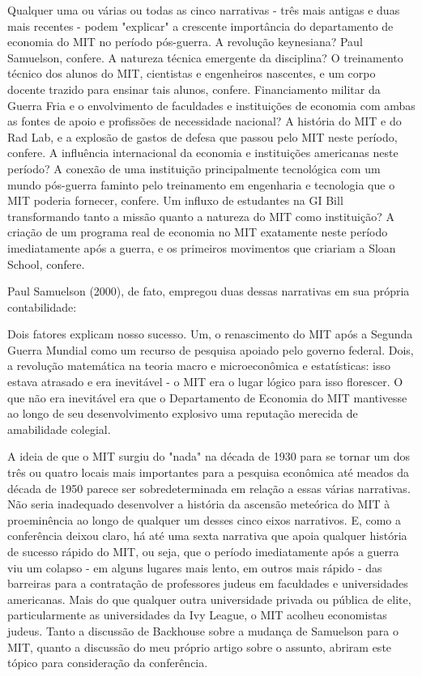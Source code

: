\documentclass[a4paper,12pt]{article}[abntex2]
\begin{document}
Qualquer uma ou várias ou todas as cinco narrativas - três mais antigas e duas mais recentes - podem "explicar" a crescente importância do departamento de economia do MIT no período pós-guerra. A revolução keynesiana? Paul Samuelson, confere. A natureza técnica emergente da disciplina? O treinamento técnico dos alunos do MIT, cientistas e engenheiros nascentes, e um corpo docente trazido para ensinar tais alunos, confere. Financiamento militar da Guerra Fria e o envolvimento de faculdades e instituições de economia com ambas as fontes de apoio e profissões de necessidade nacional? A história do MIT e do Rad Lab, e a explosão de gastos de defesa que passou pelo MIT neste período, confere. A influência internacional da economia e instituições americanas neste período? A conexão de uma instituição principalmente tecnológica com um mundo pós-guerra faminto pelo treinamento em engenharia e tecnologia que o MIT poderia fornecer, confere. Um influxo de estudantes na GI Bill transformando tanto a missão quanto a natureza do MIT como instituição? A criação de um programa real de economia no MIT exatamente neste período imediatamente após a guerra, e os primeiros movimentos que criariam a Sloan School, confere.

Paul Samuelson (2000), de fato, empregou duas dessas narrativas em sua própria contabilidade:

Dois fatores explicam nosso sucesso. Um, o renascimento do MIT após a Segunda Guerra Mundial como um recurso de pesquisa apoiado pelo governo federal. Dois, a revolução matemática na teoria macro e microeconômica e estatísticas: isso estava atrasado e era inevitável - o MIT era o lugar lógico para isso florescer. O que não era inevitável era que o Departamento de Economia do MIT mantivesse ao longo de seu desenvolvimento explosivo uma reputação merecida de amabilidade colegial.

A ideia de que o MIT surgiu do "nada" na década de 1930 para se tornar um dos três ou quatro locais mais importantes para a pesquisa econômica até meados da década de 1950 parece ser sobredeterminada em relação a essas várias narrativas. Não seria inadequado desenvolver a história da ascensão meteórica do MIT à proeminência ao longo de qualquer um desses cinco eixos narrativos. E, como a conferência deixou claro, há até uma sexta narrativa que apoia qualquer história de sucesso rápido do MIT, ou seja, que o período imediatamente após a guerra viu um colapso - em alguns lugares mais lento, em outros mais rápido - das barreiras para a contratação de professores judeus em faculdades e universidades americanas. Mais do que qualquer outra universidade privada ou pública de elite, particularmente as universidades da Ivy League, o MIT acolheu economistas judeus. Tanto a discussão de Backhouse sobre a mudança de Samuelson para o MIT, quanto a discussão do meu próprio artigo sobre o assunto, abriram este tópico para consideração da conferência.
\end{document}
